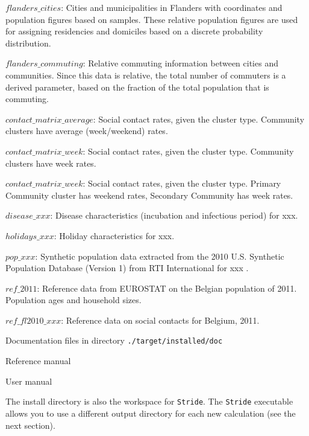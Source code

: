 \begin{compactitem}
\begin{compactitem}
        	\item $flanders\_cities$: Cities and municipalities in Flanders with coordinates and population figures based on samples. These relative population figures are used for assigning residencies and domiciles based on a discrete probability distribution.
        	\item $flanders\_commuting$: Relative commuting information between cities and communities. Since this data is relative, the total number of commuters is a derived parameter, based on the fraction of the total population that is commuting.
			\item $contact\_matrix\_average$: Social contact rates, given the cluster type. Community clusters have average (week/weekend) rates.
			\item $contact\_matrix\_week$: Social contact rates, given the cluster type. Community clusters have week rates.
			\item $contact\_matrix\_week$: Social contact rates, given the cluster type. Primary Community cluster has weekend rates, Secondary Community has week rates.
			\item $disease\_xxx$: Disease characteristics (incubation and infectious period) for xxx.
			\item $holidays\_xxx$: Holiday characteristics for xxx.
			\item $pop\_xxx$: Synthetic population data extracted from the 2010 U.S. Synthetic Population Database (Version 1) from RTI International for xxx \cite{wheaton2014a,wheaton2014b}.
			\item $ref\_2011$: Reference data from EUROSTAT on the Belgian population of 2011. Population ages and household sizes.
			\item $ref\_fl2010\_xxx$: Reference data on social contacts for Belgium, 2011.
        \end{compactitem}
%
    \item Documentation files in directory \texttt{./target/installed/doc}
      	\begin{compactitem}
        			\item Reference manual
        			\item User manual
        \end{compactitem}
%
\end{compactitem}

The install directory is also the workspace for \texttt{Stride}. The \texttt{Stride} executable allows you to use a different output directory for each new calculation (see the next section).


